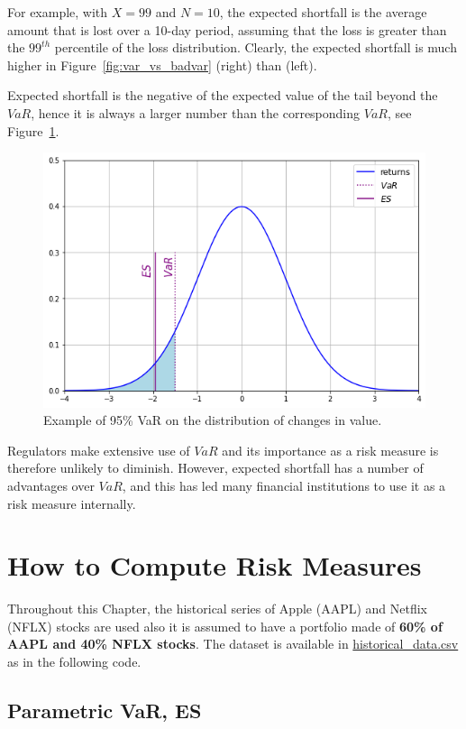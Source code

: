 For example, with $X = 99$ and $N = 10$, the expected shortfall is the average amount that is lost over a 10-day period, assuming that the loss is greater than the $99^{th}$ percentile of the loss distribution.  Clearly, the expected shortfall is much higher in Figure~\ref{fig:var_vs_badvar} (right) than (left). 

Expected shortfall is the negative of the expected value of the tail beyond the $VaR$, hence it is always a larger number than the corresponding $VaR$, see Figure~\ref{fig:es_loss}.

\begin{figure}[htb]
\centering
\includegraphics[width=0.6\linewidth]{figures/es}
\caption{Example of 95\% VaR on the distribution of changes in value.}
\label{fig:es_loss}
\end{figure}

Regulators make extensive use of $VaR$ and its importance as a risk measure is therefore unlikely to diminish. However, expected shortfall has a number of advantages over $VaR$, and this has led many financial institutions to use it as a risk measure internally. 

\section{How to Compute Risk Measures}
\label{how-to-estimate-the-var}

Throughout this Chapter, the historical series of Apple (AAPL) and Netflix (NFLX) stocks are used also it is assumed to have a portfolio made of \textbf{60\% of AAPL and 40\% NFLX stocks}. The dataset is available in \href{https://raw.githubusercontent.com/matteosan1/finance_course/master/input_files/historical_data.csv}{historical\_data.csv} as in the following code.

\subsection{Parametric VaR, ES}

